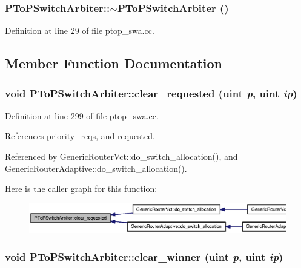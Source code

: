 \subsubsection[{$\sim$PToPSwitchArbiter}]{\setlength{\rightskip}{0pt plus 5cm}PToPSwitchArbiter::$\sim$PToPSwitchArbiter ()}\label{classPToPSwitchArbiter_f59e4ed8cfb944b1ca266cdfc413b078}




Definition at line 29 of file ptop\_\-swa.cc.

\subsection{Member Function Documentation}
\subsubsection[{clear\_\-requested}]{\setlength{\rightskip}{0pt plus 5cm}void PToPSwitchArbiter::clear\_\-requested ({\bf uint} {\em p}, \/  {\bf uint} {\em ip})}\label{classPToPSwitchArbiter_c21620597bbc0344eec88c21b254a310}




Definition at line 299 of file ptop\_\-swa.cc.

References priority\_\-reqs, and requested.

Referenced by GenericRouterVct::do\_\-switch\_\-allocation(), and GenericRouterAdaptive::do\_\-switch\_\-allocation().

Here is the caller graph for this function:\nopagebreak
\begin{figure}[H]
\begin{center}
\leavevmode
\includegraphics[width=420pt]{classPToPSwitchArbiter_c21620597bbc0344eec88c21b254a310_icgraph}
\end{center}
\end{figure}
\subsubsection[{clear\_\-winner}]{\setlength{\rightskip}{0pt plus 5cm}void PToPSwitchArbiter::clear\_\-winner ({\bf uint} {\em p}, \/  {\bf uint} {\em ip})}\label{classPToPSwitchArbiter_752c022c63e6552d06798d65e634f8d4}




